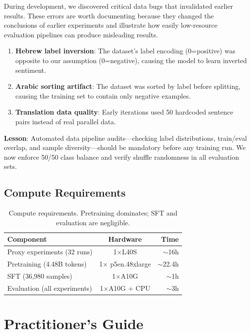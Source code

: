 \documentclass[10pt,twocolumn]{article}
\begin{document}
During development, we discovered critical data bugs that invalidated earlier results. These errors are worth documenting because they changed the conclusions of earlier experiments and illustrate how easily low-resource evaluation pipelines can produce misleading results.

\begin{enumerate}
    \item \textbf{Hebrew label inversion}: The dataset's label encoding (0=positive) was opposite to our assumption (0=negative), causing the model to learn inverted sentiment.
    \item \textbf{Arabic sorting artifact}: The dataset was sorted by label before splitting, causing the training set to contain only negative examples.
    \item \textbf{Translation data quality}: Early iterations used 50 hardcoded sentence pairs instead of real parallel data.
\end{enumerate}

\textbf{Lesson}: Automated data pipeline audits---checking label distributions, train/eval overlap, and sample diversity---should be mandatory before any training run. We now enforce 50/50 class balance and verify shuffle randomness in all evaluation sets.

\subsection{Compute Requirements}

\begin{table}[H]
\centering\small
\begin{tabular}{lcr}
\toprule
\textbf{Component} & \textbf{Hardware} & \textbf{Time} \\
\midrule
Proxy experiments (32 runs) & 1$\times$L40S & $\sim$16h \\
Pretraining (4.48B tokens) & 1$\times$ p5en.48xlarge & $\sim$22.4h \\
SFT (36,980 samples) & 1$\times$A10G & $\sim$1h \\
Evaluation (all experiments) & 1$\times$A10G + CPU & $\sim$3h \\
\bottomrule
\end{tabular}
\caption{Compute requirements. Pretraining dominates; SFT and evaluation are negligible.}
\label{tab:compute}
\end{table}

\section{Practitioner's Guide}
\label{sec:guide}
\end{document}
